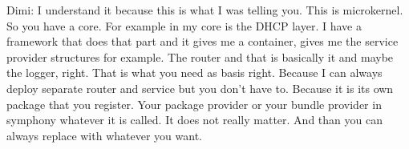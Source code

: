 Dimi: I understand it because this is what I was telling you. This is microkernel. So you have a core. For example in my core is the DHCP layer. I have a framework that does that part and it gives me a container, gives me the service provider structures for example. The router and that is basically it and maybe the logger, right. That is what you need as basis right. Because I can always deploy separate router and service but you don't have to. Because it is its own package that you register. Your package provider or your bundle provider in symphony whatever it is called. It does not really matter. And than you can always replace with whatever you want.
